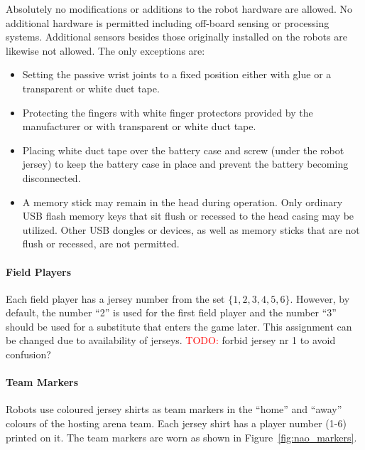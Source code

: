 Absolutely no modifications or additions to the robot hardware are allowed. No additional hardware is permitted including off-board sensing or processing systems. Additional sensors besides those originally installed on the robots are likewise not allowed. The only exceptions are:
\begin{itemize}
	\item Setting the passive wrist joints to a fixed position either with glue or a transparent or white duct tape.
	\item Protecting the fingers with white finger protectors provided by the manufacturer or with transparent or white duct tape.
	\item Placing white duct tape over the battery case and screw (under the robot jersey) to keep the battery case in place and prevent the battery becoming disconnected.
	\item A memory stick may remain in the head during operation.  Only ordinary USB flash memory keys that sit flush or recessed to the head casing may be utilized. Other USB dongles or devices, as well as memory sticks that are not flush or recessed, are not permitted.
\end{itemize}

\paragraph{Field Players}
\label{sec:field_players}
Each field player has a jersey number from the set $\{1, 2, 3, 4, 5, 6\}$. However, by default, the number ``2'' is used for the first field player and the number ``3'' should be used for a substitute that enters the game later. This assignment can be changed due to availability of jerseys. \textcolor{red}{TODO:} forbid jersey nr 1 to avoid confusion?

\paragraph{Team Markers}
\label{sec:team_markers}
Robots use coloured jersey shirts as team markers in the ``home'' and ``away'' colours of the hosting arena team. Each jersey shirt has a player number (1-6) printed on it. The team markers are worn as shown in Figure~\ref{fig:nao_markers}.

